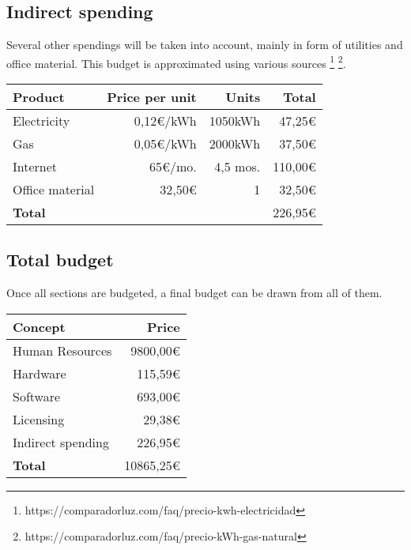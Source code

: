 \subsection{Indirect spending}

Several other spendings will be taken into account, mainly in form of utilities and office material. This budget is approximated using various sources
\footnote{https://comparadorluz.com/faq/precio-kwh-electricidad}
\footnote{https://comparadorluz.com/faq/precio-kWh-gas-natural}.

\begin{center}
    \begin{tabular}{ | l | r | r | r | }
        \hline
        \textbf{Product} & \textbf{Price per unit} &
        \textbf{Units} & \textbf{Total} \\ 
        \hline
        \hline
        Electricity & 0,12€/kWh & 1050kWh & 47,25€ \\  
        Gas & 0,05€/kWh & 2000kWh & 37,50€ \\  
        Internet & 65€/mo. & 4,5 mos. & 110,00€ \\  
        Office material & 32,50€ & 1 & 32,50€ \\  
        \hline
        \textbf{Total} & & & 226,95€ \\      
        \hline
    \end{tabular}
\end{center}

\subsection{Total budget}

Once all sections are budgeted, a final budget can be drawn from all of them.

\begin{center}
    \begin{tabular}{ | l | r | }
        \hline
        \textbf{Concept} & \textbf{Price} \\
        \hline
        \hline
        Human Resources & 9800,00€ \\  
        Hardware & 115,59€ \\  
        Software & 693,00€ \\  
        Licensing & 29,38€ \\
        Indirect spending & 226,95€ \\
        \hline
        \textbf{Total} & 10865,25€ \\      
        \hline
    \end{tabular}
\end{center}

